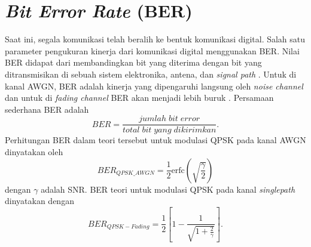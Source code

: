 \section{\textit{Bit Error Rate} (BER)}
Saat ini, segala komunikasi telah beralih ke bentuk komunikasi digital. Salah satu parameter pengukuran kinerja dari komunikasi digital menggunakan BER. Nilai BER didapat dari membandingkan bit yang diterima dengan bit yang ditransmisikan di sebuah sistem elektronika, antena, dan \textit{signal path} \cite{ber1}. Untuk di kanal AWGN, BER adalah kinerja yang dipengaruhi langsung oleh \textit{noise channel} dan untuk di \textit{fading channel} BER akan menjadi lebih buruk \cite{ber2}.
Persamaan sederhana BER adalah
\begin{equation}
BER=\frac{jumlah \; bit \; error}{total \; bit \; yang \; dikirimkan}.
\label{eq: Persamaan BER sederhana}
\end{equation} %
Perhitungan BER dalam teori tersebut untuk modulasi QPSK pada kanal AWGN dinyatakan oleh
\begin{equation}
BER_{QPSK\_AWGN}=\frac{1}{2} \mathrm{erfc} \left(  \sqrt{\frac{\gamma}{2} }  \right)
\end{equation}
dengan $\gamma$ adalah SNR. BER teori untuk modulasi QPSK pada kanal \textit{singlepath} dinyatakan dengan 
\begin{equation}
BER_{QPSK-Fading}= \frac{1}{2}\left [ 1-\frac{1}{\sqrt{1+\frac{2}{\gamma}}} \right ].
\end{equation} 

